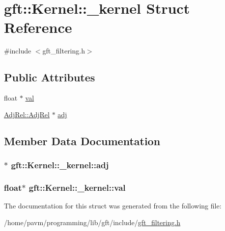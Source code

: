 \hypertarget{structgft_1_1Kernel_1_1__kernel}{\section{gft\-:\-:Kernel\-:\-:\-\_\-kernel Struct Reference}
\label{structgft_1_1Kernel_1_1__kernel}
}


{\ttfamily \#include $<$gft\-\_\-filtering.\-h$>$}

\subsection*{Public Attributes}
\begin{DoxyCompactItemize}
\item 
float $\ast$ \hyperlink{structgft_1_1Kernel_1_1__kernel_af2ea14fbe3a223c113f1adf5b2a3e533}{val}
\item 
\hyperlink{namespacegft_1_1AdjRel_a832ff5521af7a9801ff18dc3ae629b68}{Adj\-Rel\-::\-Adj\-Rel} $\ast$ \hyperlink{structgft_1_1Kernel_1_1__kernel_aa0fef087eefbfa7723a44e8222608666}{adj}
\end{DoxyCompactItemize}


\subsection{Member Data Documentation}
\hypertarget{structgft_1_1Kernel_1_1__kernel_aa0fef087eefbfa7723a44e8222608666}{
\subsubsection[{adj}]{$\ast$ gft\-::\-Kernel\-::\-\_\-kernel\-::adj}}\label{structgft_1_1Kernel_1_1__kernel_aa0fef087eefbfa7723a44e8222608666}
\hypertarget{structgft_1_1Kernel_1_1__kernel_af2ea14fbe3a223c113f1adf5b2a3e533}{
\subsubsection[{val}]{\setlength{\rightskip}{0pt plus 5cm}float$\ast$ gft\-::\-Kernel\-::\-\_\-kernel\-::val}}\label{structgft_1_1Kernel_1_1__kernel_af2ea14fbe3a223c113f1adf5b2a3e533}


The documentation for this struct was generated from the following file\-:\begin{DoxyCompactItemize}
\item 
/home/pavm/programming/lib/gft/include/\hyperlink{gft__filtering_8h}{gft\-\_\-filtering.\-h}\end{DoxyCompactItemize}
